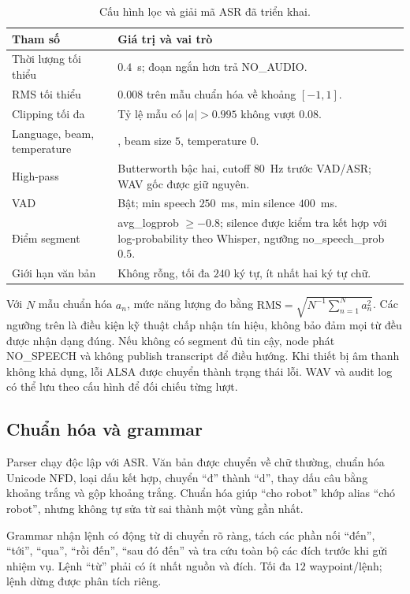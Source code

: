 \documentclass[12pt,a4paper]{article}
\newcommand{\code}[1]{\texttt{\detokenize{#1}}}
\begin{document}
\begin{table}[H]
\centering\small
\caption{Cấu hình lọc và giải mã ASR đã triển khai.}
\begin{tabularx}{\linewidth}{@{}lY@{}}
\toprule
Tham số & Giá trị và vai trò \\
\midrule
Thời lượng tối thiểu & $0.4$~s; đoạn ngắn hơn trả NO\_AUDIO. \\
RMS tối thiểu & $0.008$ trên mẫu chuẩn hóa về khoảng $[-1,1]$. \\
Clipping tối đa & Tỷ lệ mẫu có $|a|>0.995$ không vượt $0.08$. \\
Language, beam, temperature & \code{vi}, beam size $5$, temperature $0$. \\
High-pass & Butterworth bậc hai, cutoff $80$~Hz trước VAD/ASR; WAV gốc được giữ nguyên. \\
  VAD & Bật; min speech $250$~ms, min silence $400$~ms. \\
Điểm segment & avg\_logprob $\geq-0.8$; silence được kiểm tra kết hợp với log-probability theo Whisper, ngưỡng no\_speech\_prob $0.5$. \\
Giới hạn văn bản & Không rỗng, tối đa $240$ ký tự, ít nhất hai ký tự chữ. \\
\bottomrule
\end{tabularx}
\end{table}

Với $N$ mẫu chuẩn hóa $a_n$, mức năng lượng đo bằng
$\mathrm{RMS}=\sqrt{N^{-1}\sum_{n=1}^{N}a_n^2}$.
Các ngưỡng trên là điều kiện kỹ thuật chấp nhận tín hiệu, không bảo đảm
mọi từ đều được nhận dạng đúng. Nếu không có segment đủ tin cậy, node
phát NO\_SPEECH và không publish transcript để điều hướng. Khi thiết bị
âm thanh không khả dụng, lỗi ALSA được chuyển thành trạng thái lỗi.
WAV và audit log có thể lưu theo cấu hình để đối chiếu từng lượt.

\subsection{Chuẩn hóa và grammar}
Parser chạy độc lập với ASR. Văn bản được chuyển về chữ thường, chuẩn
hóa Unicode NFD, loại dấu kết hợp, chuyển ``đ'' thành ``d'', thay dấu câu
bằng khoảng trắng và gộp khoảng trắng. Chuẩn hóa giúp ``cho robot''
khớp alias ``chó robot'', nhưng không tự sửa từ sai thành một vùng gần nhất.

Grammar nhận lệnh có động từ di chuyển rõ ràng, tách các phần nối
``đến'', ``tới'', ``qua'', ``rồi đến'', ``sau đó đến'' và tra cứu toàn bộ
các đích trước khi gửi nhiệm vụ. Lệnh ``từ'' phải có ít nhất nguồn và
đích. Tối đa $12$ waypoint/lệnh; lệnh dừng được phân tích riêng.
\end{document}
